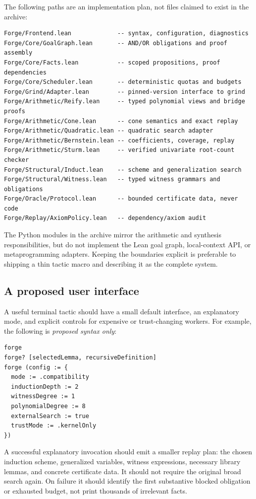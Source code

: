 \documentclass[11pt,a4paper]{article}
\theoremstyle{definition}
\begin{document}
The following paths are an implementation plan, not files claimed to exist in the archive:

\begin{lstlisting}
Forge/Frontend.lean             -- syntax, configuration, diagnostics
Forge/Core/GoalGraph.lean       -- AND/OR obligations and proof assembly
Forge/Core/Facts.lean           -- scoped propositions, proof dependencies
Forge/Core/Scheduler.lean       -- deterministic quotas and budgets
Forge/Grind/Adapter.lean        -- pinned-version interface to grind
Forge/Arithmetic/Reify.lean     -- typed polynomial views and bridge proofs
Forge/Arithmetic/Cone.lean      -- cone semantics and exact replay
Forge/Arithmetic/Quadratic.lean -- quadratic search adapter
Forge/Arithmetic/Bernstein.lean -- coefficients, coverage, replay
Forge/Arithmetic/Sturm.lean     -- verified univariate root-count checker
Forge/Structural/Induct.lean    -- scheme and generalization search
Forge/Structural/Witness.lean   -- typed witness grammars and obligations
Forge/Oracle/Protocol.lean      -- bounded certificate data, never code
Forge/Replay/AxiomPolicy.lean   -- dependency/axiom audit
\end{lstlisting}

The Python modules in the archive mirror the arithmetic and synthesis responsibilities, but do not implement the Lean goal graph, local-context API, or metaprogramming adapters. Keeping the boundaries explicit is preferable to shipping a thin tactic macro and describing it as the complete system.

\subsection{A proposed user interface}

A useful terminal tactic should have a small default interface, an explanatory mode, and explicit controls for expensive or trust-changing workers. For example, the following is \emph{proposed syntax only}:

\begin{lstlisting}
forge
forge? [selectedLemma, recursiveDefinition]
forge (config := {
  mode := .compatibility
  inductionDepth := 2
  witnessDegree := 1
  polynomialDegree := 8
  externalSearch := true
  trustMode := .kernelOnly
})
\end{lstlisting}

A successful explanatory invocation should emit a smaller replay plan: the chosen induction scheme, generalized variables, witness expressions, necessary library lemmas, and concrete certificate data. It should not require the original broad search again. On failure it should identify the first substantive blocked obligation or exhausted budget, not print thousands of irrelevant facts.
\end{document}
